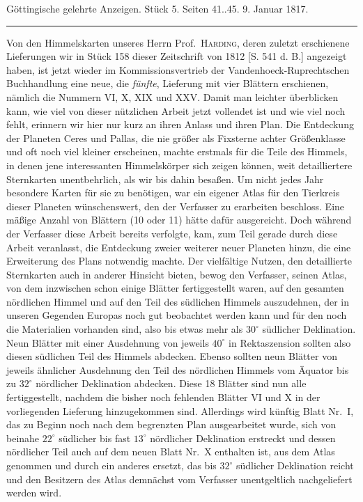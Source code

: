 \clearpage
{}
\hypertarget{native-598-lower}{}
\begin{center}\small Göttingische gelehrte Anzeigen. Stück 5. Seiten 41..45. 9. Januar 1817.\\[3pt]\rule{.72\linewidth}{.3pt}\end{center}

Von den Himmelskarten unseres Herrn Prof.\ \textsc{Harding}, deren zuletzt erschienene Lieferungen wir in Stück 158 dieser Zeitschrift von 1812 [S. 541 d. B.] angezeigt haben, ist jetzt wieder im Kommissionsvertrieb der Vandenhoeck-Ruprechtschen Buchhandlung eine neue, die \emph{fünfte}, Lieferung mit vier Blättern erschienen, nämlich die Nummern VI, X, XIX und XXV. Damit man leichter überblicken kann, wie viel von dieser nützlichen Arbeit jetzt vollendet ist und wie viel noch fehlt, erinnern wir hier nur kurz an ihren Anlass und ihren Plan. Die Entdeckung der Planeten Ceres und Pallas, die nie größer als Fixsterne achter Größenklasse und oft noch viel kleiner erscheinen, machte erstmals für die Teile des Himmels, in denen jene interessanten Himmelskörper sich zeigen können, weit detailliertere Sternkarten unentbehrlich, als wir bis dahin besaßen. Um nicht jedes Jahr besondere Karten für sie zu benötigen, war ein eigener Atlas für den Tierkreis dieser Planeten wünschenswert, den der Verfasser zu erarbeiten beschloss. Eine mäßige Anzahl von Blättern (10 oder 11) hätte dafür ausgereicht. Doch während der Verfasser diese Arbeit bereits verfolgte, kam, zum Teil gerade durch diese Arbeit veranlasst, die Entdeckung zweier weiterer neuer Planeten hinzu, die eine Erweiterung des Plans notwendig machte. Der vielfältige Nutzen, den detaillierte Sternkarten auch in anderer Hinsicht bieten, bewog den Verfasser, seinen Atlas, von dem inzwischen schon einige Blätter fertiggestellt waren, auf den gesamten nördlichen Himmel und auf den Teil des südlichen Himmels auszudehnen, der in unseren Gegenden Europas noch gut beobachtet werden kann und für den noch die Materialien vorhanden sind, also bis etwas mehr als $30^\circ$ südlicher Deklination. Neun Blätter mit einer Ausdehnung von jeweils $40^\circ$ in Rektaszension sollten also diesen südlichen Teil des Himmels abdecken. Ebenso sollten neun Blätter von jeweils ähnlicher Ausdehnung den Teil des nördlichen Himmels vom Äquator bis zu $32^\circ$ nördlicher Deklination abdecken. Diese 18 Blätter sind nun alle fertiggestellt, nachdem die bisher noch fehlenden Blätter VI und X in der vorliegenden Lieferung hinzugekommen sind. Allerdings wird künftig Blatt Nr.\ I, das zu Beginn noch nach dem begrenzten Plan ausgearbeitet wurde, sich von beinahe $22^\circ$ südlicher bis fast $13^\circ$ nördlicher Deklination erstreckt und dessen nördlicher Teil auch auf dem neuen Blatt Nr.\ X enthalten ist, aus dem Atlas genommen und durch ein anderes ersetzt, das bis $32^\circ$ südlicher Deklination reicht und den Besitzern des Atlas demnächst vom Verfasser unentgeltlich nachgeliefert werden wird.

